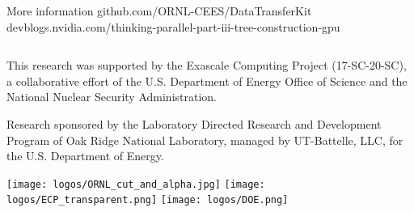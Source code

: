 \documentclass[final,hyperref={pdfpagelabels=false}]{beamer}
\begin{document}
\begin{frame}[t,fragile]
\begin{columns}[t]
\begin{column}{.480\textwidth}
\begin{block}{\centering More information}
  github.com/ORNL-CEES/DataTransferKit
  devblogs.nvidia.com/thinking-parallel-part-iii-tree-construction-gpu
\end{block}

\end{column}

\begin{column}{.015\textwidth}\end{column}

\end{columns}

\vfill

\begin{center}
\footnotesize
This research was supported by the Exascale Computing Project (17-SC-20-SC), a
collaborative effort of the U.S. Department of Energy Office of Science and the
National Nuclear Security Administration.

Research sponsored by the Laboratory
Directed Research and Development Program of Oak Ridge National Laboratory,
managed by UT-Battelle, LLC, for the U.S. Department of Energy.
\end{center}


\begin{center}
  \texttt{[image: logos/ORNL\_cut\_and\_alpha.jpg]}\hspace{7ex}
  \texttt{[image: logos/ECP\_transparent.png]}\hspace{5ex}
  \texttt{[image: logos/DOE.png]}\hspace{7ex}
\end{center}

\end{frame}
\end{document}
